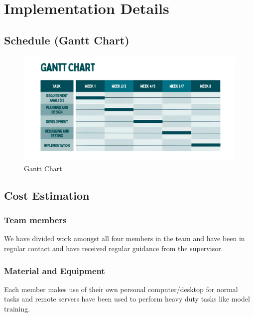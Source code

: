     \chapter{Implementation Details}
        \section{Schedule (Gantt Chart)}
	
	\begin{figure}[h]
	 \centering
	\includegraphics[width=\textwidth]{img/Gantt_chart.png}
	\caption{Gantt Chart}
	
	\end{figure}
	
	
 \section{Cost Estimation}
	\subsection{Team members}
We have divided work amongst all four members in the team and have been in regular contact and have received regular guidance from the supervisor.
\subsection{Material and Equipment}
Each member makes use of their own personal computer/desktop for normal tasks and remote servers have been used to perform heavy duty tasks like model training.